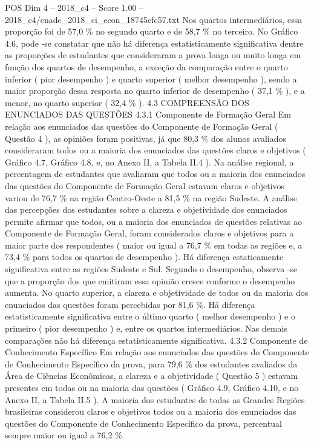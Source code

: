 \begin{textsample}{POS Dim 4 – 2018\_c4 – Score 1.00 – 2018\_c4/enade\_2018\_ci\_econ\_18745efc57.txt}
Nos quartos intermediários, essa proporção foi de 57,0 \% no segundo quarto e de 58,7 \% no terceiro.
No Gráfico 4.6, pode -se constatar que não há diferença estatisticamente significativa dentre as proporções de estudantes que consideraram a prova longa ou muito longa em função dos quartos de desempenho, a exceção da comparação entre o quarto inferior ( pior desempenho ) e quarto superior ( melhor desempenho ), sendo a maior proporção dessa resposta no quarto inferior de desempenho ( 37,1 \% ), e a menor, no quarto superior ( 32,4 \% ). 4.3 COMPREENSÃO DOS ENUNCIADOS DAS QUESTÕES 4.3.1 Componente de Formação Geral Em relação aos enunciados das questões do Componente de Formação Geral ( Questão 4 ), as opiniões foram positivas, já que 80,3 \% dos alunos avaliados consideraram todos ou a maioria dos enunciados das questões claros e objetivos ( Gráfico 4.7, Gráfico 4.8, e, no Anexo II, a Tabela II.4 ).
Na análise regional, a percentagem de estudantes que avaliaram que todos ou a maioria dos enunciados das questões do Componente de Formação Geral estavam claros e objetivos variou de 76,7 \% na região Centro-Oeste a 81,5 \% na região Sudeste.
A análise das percepções dos estudantes sobre a clareza e objetividade dos enunciados permite afirmar que todos, ou a maioria dos enunciados de questões relativas ao Componente de Formação Geral, foram considerados claros e objetivos para a maior parte dos respondentes ( maior ou igual a 76,7 \% em todas as regiões e, a 73,4 \% para todos os quartos de desempenho ).
Há diferença estaticamente significativa entre as regiões Sudeste e Sul.
Segundo o desempenho, observa -se que a proporção dos que emitiram essa opinião cresce conforme o desempenho aumenta.
No quarto superior, a clareza e objetividade de todos ou da maioria dos enunciados das questões foram percebidas por 81,6 \%.
Há diferença estatisticamente significativa entre o último quarto ( melhor desempenho ) e o primeiro ( pior desempenho ) e, entre os quartos intermediários.
Nas demais comparações não há diferença estatisticamente significativa. 4.3.2 Componente de Conhecimento Específico Em relação aos enunciados das questões do Componente de Conhecimento Específico da prova, para 79,6 \% dos estudantes avaliados da Área de Ciências Econômicas, a clareza e a objetividade ( Questão 5 ) estavam presentes em todas ou na maioria das questões ( Gráfico 4.9, Gráfico 4.10, e no Anexo II, a Tabela II.5 ).
A maioria dos estudantes de todas as Grandes Regiões brasileiras considerou claros e objetivos todos ou a maioria dos enunciados das questões do Componente de Conhecimento Específico da prova, percentual sempre maior ou igual a 76,2 \%.

\end{textsample}
